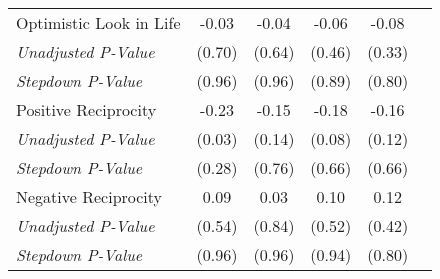 \begin{tabular}{l c c c c c}
Optimistic Look in Life & -0.03 & -0.04 & -0.06 & -0.08 \\
\quad \textit{Unadjusted P-Value} & (0.70) & (0.64) & (0.46) & (0.33) \\
\quad \textit{Stepdown P-Value} & (0.96) & (0.96) & (0.89) & (0.80) \\
Positive Reciprocity & -0.23 & -0.15 & -0.18 & -0.16 \\
\quad \textit{Unadjusted P-Value} & (0.03) & (0.14) & (0.08) & (0.12) \\
\quad \textit{Stepdown P-Value} & (0.28) & (0.76) & (0.66) & (0.66) \\
Negative Reciprocity & 0.09 & 0.03 & 0.10 & 0.12 \\
\quad \textit{Unadjusted P-Value} & (0.54) & (0.84) & (0.52) & (0.42) \\
\quad \textit{Stepdown P-Value} & (0.96) & (0.96) & (0.94) & (0.80) \\
\bottomrule
\end{tabular}
